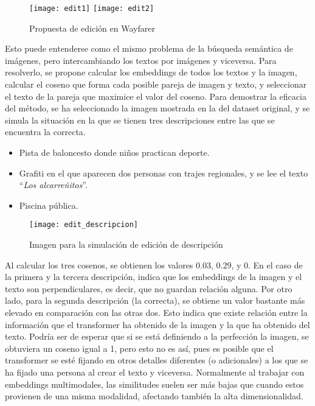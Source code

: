 		\begin{figure}[!h]
			\centering
			\texttt{[image: edit1]}\hfill
			\texttt{[image: edit2]}
			\caption{Propuesta de edición en Wayfarer}
			\label{fig:edit_wayfarer}
		\end{figure}
		
		Esto puede entenderse como el mismo problema de la búsqueda semántica de imágenes, pero intercambiando los textos por imágenes y viceversa. Para resolverlo, se propone calcular los embeddings de todos los textos y la imagen, calcular el coseno que forma cada posible pareja de imagen y texto, y seleccionar el texto de la pareja que maximice el valor del coseno. Para demostrar la eficacia del método, se ha seleccionado la imagen mostrada en la  del dataset original, y se simula la situación en la que se tienen tres descripciones entre las que se encuentra la correcta. 
		
		\begin{itemize}
			\item Pista de baloncesto donde niños practican deporte. 
			\item Grafiti en el que aparecen dos personas con trajes regionales, y se lee el texto ``\textit{Los alcarreñitos}''. 
			\item Piscina pública. 
		\end{itemize}
		
		\begin{figure}[!h]
			\centering
			\texttt{[image: edit\_descripcion]}
			\caption{Imagen para la simulación de edición de descripción}
			\label{fig:edit_descripcion}
		\end{figure}
		
		Al calcular los tres cosenos, se obtienen los valores $0.03$, $0.29$, y $0$. En el caso de la primera y la tercera descripción, indica que los embeddings de la imagen y el texto son perpendiculares, es decir, que no guardan relación alguna. Por otro lado, para la segunda descripción (la correcta), se obtiene un valor bastante más elevado en comparación con las otras dos. Esto indica que existe relación entre la información que el transformer ha obtenido de la imagen y la que ha obtenido del texto. Podría ser de esperar que si se está definiendo a la perfección la imagen, se obtuviera un coseno igual a 1, pero esto no es así, pues es posible que el transformer se esté fijando en otros detalles diferentes (o adicionales) a los que se ha fijado una persona al crear el texto y viceversa. Normalmente al trabajar con embeddings multimodales, las similitudes suelen ser más bajas que cuando estos provienen de una misma modalidad, afectando también la  alta dimensionalidad. 